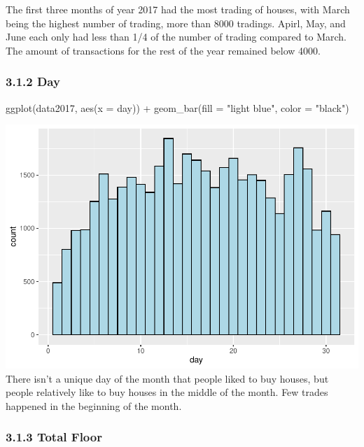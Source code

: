 \documentclass[
]{article}
\newenvironment{Shaded}{\begin{snugshade}}{\end{snugshade}}
\newcommand{\AttributeTok}[1]{\textcolor[rgb]{0.77,0.63,0.00}{#1}}
\newcommand{\FunctionTok}[1]{\textcolor[rgb]{0.00,0.00,0.00}{#1}}
\newcommand{\NormalTok}[1]{#1}
\newcommand{\SpecialCharTok}[1]{\textcolor[rgb]{0.00,0.00,0.00}{#1}}
\newcommand{\StringTok}[1]{\textcolor[rgb]{0.31,0.60,0.02}{#1}}
\begin{document}
The first three months of year 2017 had the most trading of houses, with
March being the highest number of trading, more than 8000 tradings.
Apirl, May, and June each only had less than 1/4 of the number of
trading compared to March. The amount of transactions for the rest of
the year remained below 4000.

\hypertarget{day}{%
\subsubsection{3.1.2 Day}\label{day}}

\begin{Shaded}
\begin{Highlighting}[]
\FunctionTok{ggplot}\NormalTok{(data2017, }\FunctionTok{aes}\NormalTok{(}\AttributeTok{x =}\NormalTok{ day)) }\SpecialCharTok{+} 
  \FunctionTok{geom\_bar}\NormalTok{(}\AttributeTok{fill =} \StringTok{"light blue"}\NormalTok{, }\AttributeTok{color =} \StringTok{"black"}\NormalTok{)}
\end{Highlighting}
\end{Shaded}

\includegraphics{Project_files/figure-latex/unnamed-chunk-10-1.pdf}
There isn't a unique day of the month that people liked to buy houses,
but people relatively like to buy houses in the middle of the month. Few
trades happened in the beginning of the month.

\hypertarget{total-floor}{%
\subsubsection{3.1.3 Total Floor}\label{total-floor}}
\end{document}
